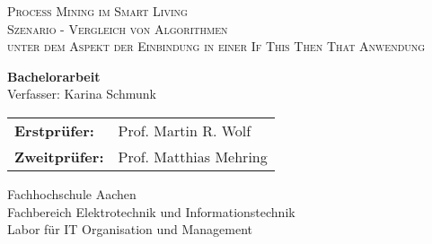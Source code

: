 \begin{titlepage}
\begin{center}
\hfill
\newcommand{\HorizontalLine}{\rule{\linewidth}{0.3mm}}
\begin{spacing}{2.5}
    \textsc{\Large  Process Mining im Smart Living} \\
    \textsc{\Large  Szenario - Vergleich von Algorithmen} \\
    \textsc{\Large   unter dem Aspekt der Einbindung in einer If This Then That Anwendung}\\
\end{spacing}
\vspace{20mm}

{\Large \bfseries Bachelorarbeit}\\[1.1cm]
{\Large Verfasser: Karina Schmunk} \\[1.2cm]

\begin{tabular}[hc]{>{\large}l >{\large}l}
  \bfseries Erstprüfer: & Prof. Martin R. Wolf \\[0.3cm]
  \bfseries Zweitprüfer: & Prof. Matthias Mehring \\[1.2cm]
\end{tabular}
\vfill  %

\Large {
    Fachhochschule Aachen\\
    Fachbereich Elektrotechnik und Informationstechnik\\
    Labor für IT Organisation und Management\\[1cm]

    
}
\end{center}
\end{titlepage}
